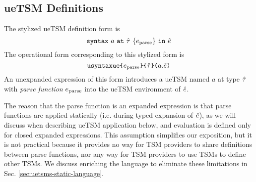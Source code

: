 
\subsection{ueTSM Definitions}\label{sec:U-uetsm-definition}
The stylized ueTSM definition form is \[\texttt{syntax}~a~\texttt{at}~{\hat\tau}~\{e_\text{parse}\}~\texttt{in}~{\hat e}\] 
The operational form corresponding to this stylized form is \[\texttt{usyntaxue}\texttt{\{}e_\text{parse}\texttt{\}\{}{\hat\tau}\texttt{\}(}a.{\hat e}\texttt{)}\]
An unexpanded expression of this form introduces a {ueTSM} named $a$ at type ${\hat\tau}$ with \emph{parse function} $e_\text{parse}$ into the ueTSM environment of ${\hat e}$. 

The reason that the parse function is an expanded expression is that parse functions are applied statically (i.e. during typed expansion of ${\hat e}$), as we will discuss when describing ueTSM application below, and evaluation is defined only for closed expanded expressions. This assumption simplifies our exposition, but it is not practical because it provides no way for TSM providers to share definitions between parse functions, nor any way for TSM providers to use TSMs to define other TSMs. We discuss enriching the language to eliminate these limitations in Sec. \ref{sec:uetsms-static-language}. %

